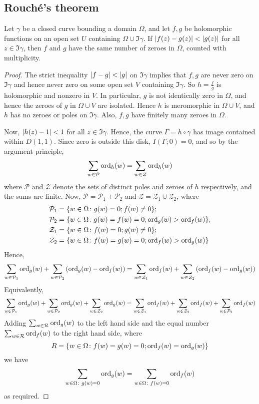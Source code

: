 \subsection{Rouch\'e's theorem}
\begin{theorem}
	Let \( \gamma \) be a closed curve bounding a domain \( \Omega \), and let \( f,g \) be holomorphic functions on an open set \( U \) containing \( \Omega \cup \Im \gamma \).
	If \( \abs{f(z) - g(z)} < \abs{g(z)} \) for all \( z \in \Im \gamma \), then \( f \) and \( g \) have the same number of zeroes in \( \Omega \), counted with multiplicity.
\end{theorem}
\begin{proof}
	The strict inequality \( \abs{f-g} < \abs{g} \) on \( \Im \gamma \) implies that \( f,g \) are never zero on \( \Im \gamma \) and hence never zero on some open set \( V \) containing \( \Im \gamma \).
	So \( h = \frac{f}{g} \) is holomorphic and nonzero in \( V \).
	In particular, \( g \) is not identically zero in \( \Omega \), and hence the zeroes of \( g \) in \( \Omega \cup V \) are isolated.
	Hence \( h \) is meromorphic in \( \Omega \cup V \), and \( h \) has no zeroes or poles on \( \Im \gamma \).
	Also, \( f, g \) have finitely many zeroes in \( \Omega \).

	Now, \( \abs{h(z) - 1} < 1 \) for all \( z \in \Im \gamma \).
	Hence, the curve \( \Gamma = h \circ \gamma \) has image contained within \( D(1,1) \).
	Since zero is outside this disk, \( I(\Gamma;0) = 0 \), and so by the argument principle,
	\[ \sum_{w \in \mathcal P} \operatorname{ord}_h(w) = \sum_{w \in \mathcal Z} \operatorname{ord}_h(w) \]
	where \( \mathcal P \) and \( \mathcal Z \) denote the sets of distinct poles and zeroes of \( h \) respectively, and the sums are finite.
	Now, \( \mathcal P = \mathcal P_1 + \mathcal P_2 \) and \( \mathcal Z = \mathcal Z_1 \cup \mathcal Z_2 \), where
	\begin{align*}
		\mathcal P_1 &= \qty{w \in \Omega \colon g(w) = 0; f(w) \neq 0}; \\
		\mathcal P_2 &= \qty{w \in \Omega \colon g(w) = f(w) = 0; \operatorname{ord}_g(w) > \operatorname{ord}_f(w)}; \\
		\mathcal Z_1 &= \qty{w \in \Omega \colon f(w) = 0; g(w) \neq 0}; \\
		\mathcal Z_2 &= \qty{w \in \Omega \colon f(w) = g(w) = 0; \operatorname{ord}_f(w) > \operatorname{ord}_g(w)}
	\end{align*}
	Hence,
	\[ \sum_{w \in \mathcal P_1} \operatorname{ord}_g(w) + \sum_{w \in \mathcal P_2} \qty(\operatorname{ord}_g(w) - \operatorname{ord}_f(w)) = \sum_{w \in \mathcal Z_1} \operatorname{ord}_f(w) + \sum_{w \in \mathcal Z_2} \qty(\operatorname{ord}_f(w) - \operatorname{ord}_g(w)) \]
	Equivalently,
	\[ \sum_{w \in \mathcal P_1} \operatorname{ord}_g(w) + \sum_{w \in \mathcal P_2} \operatorname{ord}_g(w) + \sum_{w \in \mathcal Z_2} \operatorname{ord}_g(w) =
	\sum_{w \in \mathcal Z_1} \operatorname{ord}_f(w) + \sum_{w \in \mathcal Z_2} \operatorname{ord}_f(w) + \sum_{w \in \mathcal P_2} \operatorname{ord}_f(w) \]
	Adding \( \sum_{w \in \mathcal R} \operatorname{ord}_g(w) \) to the left hand side and the equal number \( \sum_{w \in \mathcal R} \operatorname{ord}_f(w) \) to the right hand side, where
	\[ R = \qty{w \in \Omega \colon f(w) = g(w) = 0; \operatorname{ord}_f(w) = \operatorname{ord}_g(w)} \]
	we have
	\[ \sum_{w \in \Omega \colon g(w) = 0} \operatorname{ord}_g(w) = \sum_{w \in \Omega \colon f(w) = 0} \operatorname{ord}_f(w) \]
	as required.
\end{proof}
